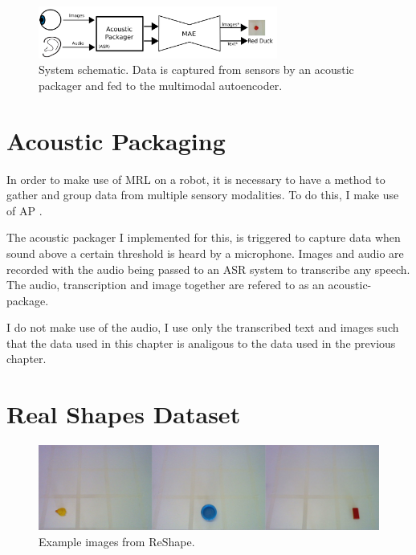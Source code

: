 \begin{figure}[h]
    \centering
    \includegraphics[width=0.7\textwidth]{Figs/chapter6/bimodal_system_schematic.png}
    \caption{System schematic. Data is captured from sensors by an acoustic packager and fed to the multimodal autoencoder.}
    \label{fig:schematic}
\end{figure}

\section{Acoustic Packaging}
In order to make use of \ac{MRL} on a robot, it is necessary to have a method to gather and group data from multiple sensory modalities. To do this, I make use of \ac{AP} \cite{schillingmann2009towards, schillingmann2009computational}.

The acoustic packager I implemented for this, is triggered to capture data when sound above a certain threshold is heard by a microphone. Images and audio are recorded with the audio being passed to an \ac{ASR} system to transcribe any speech. The audio, transcription and image together are refered to as an acoustic-package.

I do not make use of the audio, I use only the transcribed text and images such that the data used in this chapter is analigous to the data used in the previous chapter.

\section{Real Shapes Dataset}

\begin{figure}[h]
    \centering
    \includegraphics[width=\textwidth]{Figs/chapter6/ReShapeExs.png}
    \caption{Example images from ReShape.}
    \label{fig:ReShape}
\end{figure}

